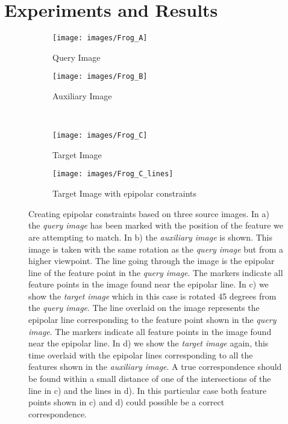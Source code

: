 \documentclass[journal]{IEEEtran}
\begin{document}
\section{Experiments and Results}
\label{S:Experiments}
%
\begin{figure}[htb]
    \begin{subfigure}[t]{0.48\columnwidth}
        \centering
        \texttt{[image: images/Frog\_A]}
        \caption{Query Image}
        \label{fig:frog_a}
    \end{subfigure}%
    \quad %
    \begin{subfigure}[t]{0.48\columnwidth}
        \centering
        \texttt{[image: images/Frog\_B]}
        \caption{Auxiliary Image}
        \label{fig:frog_b}
    \end{subfigure}%
    \\ %
    \begin{subfigure}[t]{0.48\columnwidth}
        \centering
        \texttt{[image: images/Frog\_C]}
        \caption{Target Image}
        \label{fig:frog_c}
    \end{subfigure}%
    \quad %
    \begin{subfigure}[t]{0.48\columnwidth}
        \centering
        \texttt{[image: images/Frog\_C\_lines]}
        \caption{Target Image with epipolar constraints}
        \label{fig:frog_c_lines}
    \end{subfigure}%
    \caption{Creating epipolar constraints based on three source images.  
        In a) the \emph{query image} has been marked with the position 
        of the feature we are attempting to match. In b) the 
        \emph{auxiliary image} is shown. This image is taken with the 
        same rotation as the \emph{query image} but from a higher 
        viewpoint. The line going through the image is the epipolar line 
        of the feature point in the \emph{query image}.  The markers 
        indicate all feature points in the image found near the epipolar 
        line.  In c) we show the \emph{target image} which in this case 
        is rotated 45 degrees from the \emph{query image}.  The line 
        overlaid on the image represents the epipolar line corresponding 
        to the feature point shown in the \emph{query image}.  The 
        markers indicate all feature points in the image found near the 
    epipolar line. In d) we show the \emph{target image} again, this 
    time overlaid with the epipolar lines corresponding to all the 
    features shown in the \emph{auxiliary image}. A true correspondence 
    should be found within a small distance of one of the intersections 
    of the line in c) and the lines in d). In this particular case both 
    feature points shown in c) and d) could possible be a correct 
    correspondence.
}%
    \label{fig:frog}%
\end{figure}%
\end{document}
